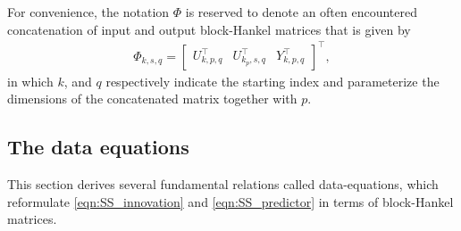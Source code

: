 For convenience, the notation $\Phi$ is reserved to denote an often encountered concatenation of input and output block-Hankel matrices that is given by
\begin{align*}
    \Phi_{k,s,q} = \begin{bmatrix}
        U_{k,p,q}^\top & U_{k_p,s,q}^\top & Y_{k,p,q}^\top
    \end{bmatrix}^\top,
\end{align*}
in which $k$, and $q$ respectively indicate the starting index and parameterize the dimensions of the concatenated matrix together with $p$.
% 
\subsection{The data equations}\label{sec:DerivingDataEquations}
This section derives several fundamental relations called data-equations, which reformulate \eqref{eqn:SS_innovation} and \eqref{eqn:SS_predictor} in terms of block-Hankel matrices.

